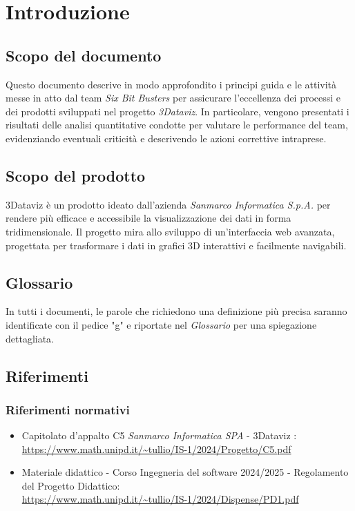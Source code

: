 \section{Introduzione}
    \subsection{Scopo del documento}
        Questo documento descrive in modo approfondito i principi guida e le attività messe in atto dal team \textit{Six Bit Busters} 
        per assicurare l'eccellenza dei processi e dei prodotti sviluppati nel progetto \textit{3Dataviz}. In particolare, vengono 
        presentati i risultati delle analisi quantitative condotte per valutare le performance del team, evidenziando eventuali 
        criticità e descrivendo le azioni correttive intraprese.

    \subsection{Scopo del prodotto}

   3Dataviz è un prodotto ideato dall'azienda \textit{Sanmarco Informatica S.p.A.} per rendere più efficace e accessibile la visualizzazione dei dati in forma tridimensionale. Il progetto mira allo sviluppo di un’interfaccia web avanzata, progettata per trasformare i dati in grafici 3D interattivi e facilmente navigabili.
        
    \subsection{Glossario}
      In tutti i documenti, le parole che richiedono una definizione più precisa saranno identificate con il pedice "g" e riportate nel \textit{Glossario} per una spiegazione dettagliata.
        
    \subsection{Riferimenti}
        \subsubsection{Riferimenti normativi}
        \begin{itemize}
            \item Capitolato d'appalto C5 \textit{Sanmarco Informatica SPA} - 3Dataviz : \\ \url{https://www.math.unipd.it/~tullio/IS-1/2024/Progetto/C5.pdf}
            \item Materiale didattico - Corso Ingegneria del software 2024/2025 - Regolamento del Progetto Didattico: \\ \url{https://www.math.unipd.it/~tullio/IS-1/2024/Dispense/PD1.pdf}
        \end{itemize}
